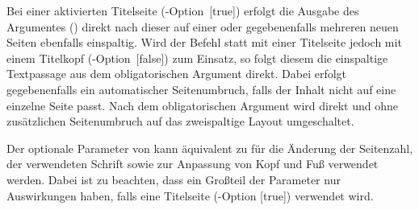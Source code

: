 \begin{Declaration*}{}
\begin{Declaration*}{}
\begin{Declaration*}{}
\begin{Declaration}{%
}
Bei einer aktivierten Titelseite (\KOMAScript-Option~[true]) 
erfolgt die Ausgabe des Argumentes () direkt nach dieser 
auf einer oder gegebenenfalls mehreren neuen Seiten ebenfalls einspaltig. Wird 
der Befehl  statt mit einer Titelseite jedoch mit 
einem Titelkopf (\KOMAScript-Option~[false]) zum Einsatz, so 
folgt diesem die einspaltige Textpassage aus dem obligatorischen Argument 
direkt. Dabei erfolgt gegebenenfalls ein automatischer Seitenumbruch, falls der 
Inhalt nicht auf eine einzelne Seite passt. Nach dem obligatorischen Argument 
 wird direkt und ohne zusätzlichen Seitenumbruch auf das 
zweispaltige Layout umgeschaltet.

Der optionale Parameter von  kann äquivalent zu 
 für die Änderung der Seitenzahl, der verwendeten Schrift 
sowie zur Anpassung von Kopf und Fuß verwendet werden. Dabei ist zu beachten, 
dass ein Großteil der Parameter nur Auswirkungen haben, falls eine Titelseite
(\KOMAScript-Option [true]) verwendet wird.
\end{Declaration}


\end{Declaration*}
\end{Declaration*}
\end{Declaration*}
